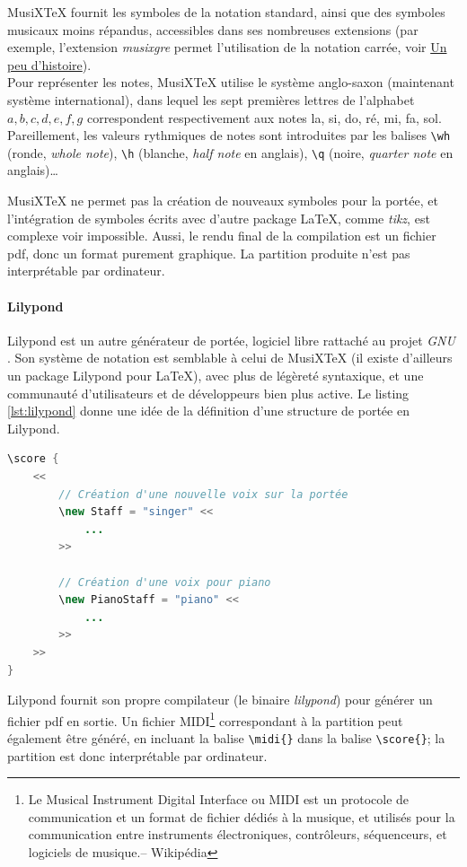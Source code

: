 MusiXTeX fournit les symboles de la notation standard, ainsi que des symboles musicaux moins répandus, accessibles dans ses nombreuses extensions (par exemple, l'extension \textit{musixgre} permet l'utilisation de la notation carrée, voir \hyperref[sec:unPeuDHistoire]{Un peu d'histoire}).\\
Pour représenter les notes, MusiXTeX utilise le système anglo-saxon (maintenant système international), dans lequel les sept premières lettres de l'alphabet $a, b, c, d, e, f, g$ correspondent respectivement aux notes la, si, do, ré, mi, fa, sol. Pareillement, les valeurs rythmiques de notes sont introduites par les balises \lstinline{\wh} (ronde, \textit{whole note}), \lstinline{\h} (blanche, \textit{half note} en anglais), \lstinline{\q} (noire, \textit{quarter note} en anglais)… 


MusiXTeX ne permet pas la création de nouveaux symboles pour la portée, et l'intégration de symboles écrits avec d'autre package \LaTeX, comme \textit{tikz}, est complexe voir impossible.
Aussi, le rendu final de la compilation est un fichier pdf, donc un format purement graphique. La partition produite n'est pas interprétable par ordinateur.

\paragraph{Lilypond} Lilypond est un autre générateur de portée, logiciel libre rattaché au projet \textit{GNU} \cite{lilypond2018}. Son système de notation est semblable à celui de MusiXTeX (il existe d'ailleurs un package Lilypond pour \LaTeX), avec plus de légèreté syntaxique, et une communauté d'utilisateurs et de développeurs bien plus active.
Le listing \ref{lst:lilypond} donne une idée de la définition d'une structure de portée en Lilypond.

\begin{lstlisting}[caption={Ecriture de partition avec Lilypond}, 
					label=lst:lilypond, captionpos=b, language=Java]
\score {
	<<
		// Création d'une nouvelle voix sur la portée
		\new Staff = "singer" <<
			...
		>>
		
		// Création d'une voix pour piano		
		\new PianoStaff = "piano" <<
			...
		>>
	>>
}
\end{lstlisting}

Lilypond fournit son propre compilateur (le binaire \textit{lilypond}) pour générer un fichier pdf en sortie. Un fichier MIDI\footnote{\og Le Musical Instrument Digital Interface ou MIDI est un protocole de communication et un format de fichier dédiés à la musique, et utilisés pour la communication entre instruments électroniques, contrôleurs, séquenceurs, et logiciels de musique.\fg -- Wikipédia} correspondant à la partition peut également être généré, en incluant la balise \lstinline|\midi{}| dans la balise \lstinline|\score{}|; la partition est donc interprétable par ordinateur.

